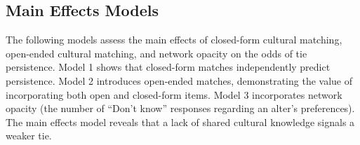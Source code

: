 \subsection{Main Effects Models}\label{main-effects-models}

The following models assess the main effects of closed-form cultural
matching, open-ended cultural matching, and network opacity on the odds
of tie persistence. Model 1 shows that closed-form matches independently
predict persistence. Model 2 introduces open-ended matches,
demonstrating the value of incorporating both open and closed-form
items. Model 3 incorporates network opacity (the number of ``Don't
know'' responses regarding an alter's preferences). The main effects
model reveals that a lack of shared cultural knowledge signals a weaker
tie.

\begin{table}

\caption{\label{tbl-models}Odds Ratios for Tie Persistence (Main Effects
Models)}

\centering{

}
\end{table}
